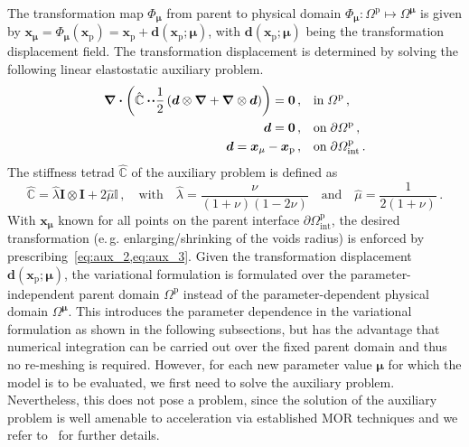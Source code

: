 \documentclass[a4paper]{eccomas_paper-2024}
\makeatletter
\newcommand{\eg}{e.\,g.\@\xspace}
\makeatother
\begin{document}
The transformation map $\Phi_{\bm\mu}$ from parent to physical domain $\Phi_{\bm\mu}: \varOmega^{\mathrm{p}}\mapsto\varOmega^{\bm\mu}$ is given by $\bm{x}_{\bm\mu}=\Phi_{\bm\mu}(\bm{x}_{\mathrm{p}}) = \bm{x}_{\mathrm{p}} + \bm{d}(\bm{x}_{\mathrm{p}}; \bm\mu)$, 
with $\bm{d}(\bm{x}_{\mathrm{p}}; \bm{\mu})$ being the transformation displacement field.
The transformation displacement is determined by solving the following linear elastostatic auxiliary problem.
\begin{align}
    \label{eq:aux_1}\div{\left(\hat{\mathbb{C}}\vdot\!\vdot\frac{1}{2}\left(
            \bm{d}\otimes\grad + \grad\otimes\bm{d}
\right)\right)}
            = \bm{0}\,,\quad&\mathrm{in}\;\varOmega^{\mathrm{p}}\,,\\
    \label{eq:aux_2}\bm{d} = \bm{0}\,,\quad&\mathrm{on}\;\partial\varOmega^{\mathrm{p}}\,,\\
    \label{eq:aux_3}\bm{d} = \bm{x}_{\mu} - \bm{x}_{\mathrm{p}}\,,\quad&\mathrm{on}\;\partial\varOmega^{\mathrm{p}}_{\mathrm{int}}\,.
\end{align}
The stiffness tetrad $\hat{\mathbb{C}}$ of the auxiliary problem is defined as
\begin{equation}
    \hat{\mathbb{C}} = \hat{\lambda} \bm{I}\otimes\bm{I} + 2\hat{\mu}\mathbb{I}\,,\quad\mathrm{with}\quad \hat{\lambda}=\frac{\nu}{(1+\nu)(1-2\nu)}\quad\mathrm{and}\quad\hat{\mu}=\frac{1}{2(1+\nu)}\,.
    \label{eq:aux_tetrad}
\end{equation}
With $\bm{x}_{\bm\mu}$ known for all points on the parent interface $\partial\varOmega^{\mathrm{p}}_{\mathrm{int}}$, the desired transformation (\eg{} enlarging/shrinking of the voids radius) is enforced by prescribing~\cref{eq:aux_2,eq:aux_3}.
Given the transformation displacement $\bm{d}(\bm{x}_{\mathrm{p}};\bm\mu)$, the variational formulation is formulated over the parameter-independent parent domain $\varOmega^{\mathrm{p}}$ instead of the parameter-dependent physical domain $\varOmega^{\bm\mu}$.
This introduces the parameter dependence in the variational formulation as shown in the following subsections, but has the advantage that numerical integration can be carried out over the fixed parent domain and thus no re-meshing is required.
However, for each new parameter value $\bm\mu$ for which the model is to be evaluated, we first need to solve the auxiliary problem.
Nevertheless, this does not pose a problem, since the solution of the auxiliary problem is well amenable to acceleration via established MOR techniques and we refer to~\cite{Guo2022Learning} for further details.
\end{document}

